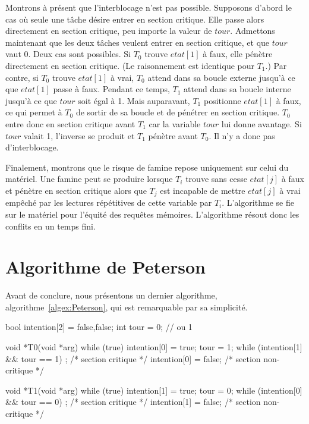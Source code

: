 Montrons à présent que l'interblocage n'est pas possible.
Supposons d'abord le cas où seule une tâche désire entrer en section critique. Elle passe alors directement en section critique, peu importe la valeur de $tour$.  Admettons maintenant que les deux tâches veulent entrer en section critique, et que $tour$ vaut 0. Deux cas sont possibles. Si $T_0$ trouve $etat[1]$ à faux,
elle pénètre directement en section critique.
(Le raisonnement est identique pour $T_1$.)
Par contre, si $T_0$ trouve $etat[1]$ à vrai, $T_0$ attend dans sa boucle externe jusqu'à ce que $etat[1]$ passe à faux. Pendant ce temps, $T_1$ attend dans sa boucle interne jusqu'à ce que $tour$ soit égal à 1.  Mais auparavant, $T_1$ positionne $etat[1]$ à faux, ce qui permet à $T_0$ de sortir de sa boucle et de pénétrer en section critique. $T_0$ entre donc en section critique avant $T_1$ car la variable $tour$ lui donne avantage.  Si $tour$ valait 1, l'inverse se produit et $T_1$ pénètre avant $T_0$.  Il n'y a donc pas d'interblocage.
\par
Finalement, montrons que le risque de famine repose uniquement sur celui du matériel.  Une famine peut se produire lorsque $T_i$ trouve sans cesse $etat[j]$ à faux et pénètre en section critique alors que $T_j$ est incapable de mettre $etat[j]$ à vrai empêché par les lectures répétitives de cette variable par $T_i$.
L'algorithme se fie sur le matériel pour l'équité des requêtes mémoires.  L'algorithme résout donc les conflits en un temps fini.

\section{Algorithme de Peterson}
Avant de conclure, nous présentons un dernier algorithme, algorithme~\ref{algex:Peterson}, qui est remarquable par sa simplicité.

\begin{codeblock}[label=algex:Peterson, title={Algorithme de Peterson}]
bool intention[2] = {false,false};
int tour = 0; // ou 1

void *T0(void *arg)
{
  while (true) {
    intention[0] = true;
    tour = 1;
    while (intention[1] && tour == 1)
      ;
    /* section critique */
    intention[0] = false;
    /* section non-critique */
  }
}

void *T1(void *arg)
{
  while (true) {
    intention[1] = true;
    tour = 0;
    while (intention[0] && tour == 0)
      ;
    /* section critique */
    intention[1] = false;
    /* section non-critique */
  }
}
\end{codeblock}

